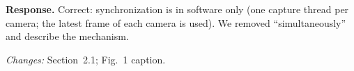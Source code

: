 \textbf{Response.} Correct: synchronization is in software only (one capture thread per camera; the latest frame of each camera is used). We removed ``simultaneously'' and describe the mechanism.

\textit{Changes:} Section~2.1; Fig.~1 caption.
